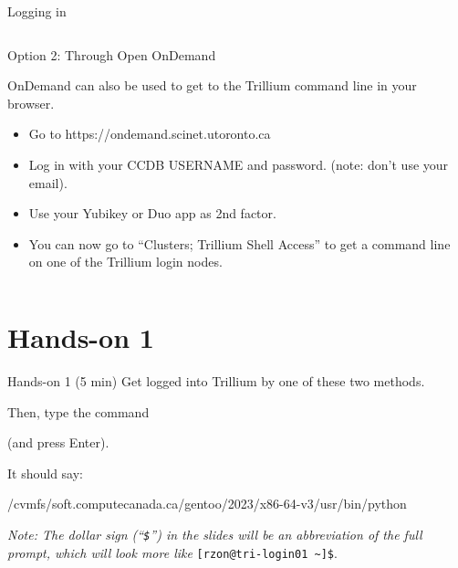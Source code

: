\documentclass[
  10pt,
  ignorenonframetext,
  aspectratio=169]{beamer}
\newenvironment{Shaded}{\begin{snugshade}}{\end{snugshade}}
\newcommand{\DecValTok}[1]{\textcolor[rgb]{0.86,0.86,0.80}{#1}}
\newcommand{\ExtensionTok}[1]{\textcolor[rgb]{0.80,0.80,0.80}{#1}}
\newcommand{\NormalTok}[1]{\textcolor[rgb]{0.80,0.80,0.80}{#1}}
\begin{document}
\begin{frame}[fragile]{Logging in}
\begin{columns}[T]
\begin{column}{0.47\linewidth}
\begin{block}{Option 2: Through Open OnDemand}
\pause

OnDemand can also be used to get to the Trillium command line in \alert{your browser.}

\begin{itemize}
\item
  Go to \alert{https://ondemand.scinet.utoronto.ca}

  \pause
\item
  Log in with your CCDB USERNAME and password. (note: don't use your email).

  \pause
\item
  Use your Yubikey or Duo app as 2nd factor.

  \pause
\item
  You can now go to ``Clusters; Trillium Shell Access'' to get a command line on one of the Trillium login nodes.
\end{itemize}
\end{block}
\end{column}
\end{columns}
\end{frame}

\section{Hands-on 1}\label{hands-on-1}

\begin{frame}[fragile]{Hands-on 1 (5 min)}
\label{hands-on-1-5-min}
Get logged into Trillium by one of these two methods.

Then, type the command

\begin{Shaded}
\end{Shaded}

(and press Enter).

It should say:

\begin{Shaded}
\begin{Highlighting}[]
\NormalTok{/cvmfs/soft.computecanada.ca/gentoo/}\DecValTok{2023}\NormalTok{/x86}\DecValTok{{-}64}\NormalTok{{-}v3/usr/bin/python}
\end{Highlighting}
\end{Shaded}

\vspace{\baselineskip}

\pause

\emph{Note: The dollar sign (``\texttt{\$}'') in the slides will be an abbreviation of the full prompt, which will look more like} \texttt{{[}rzon@tri-login01\ \textasciitilde{}{]}\$}.
\end{frame}
\end{document}
